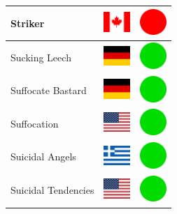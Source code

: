 \documentclass[12pt, a4paper, twoside]{report}
\begin{document}
\begin{center}
\begin{longtable}{|p{5cm}|p{2cm}|p{2cm}|}
 Striker                                                    & \includegraphics[width=1cm]{../4x3/ca} &   \includegraphics[width=1cm]{../likes/n} \\ \hline
 Sucking Leech                                              & \includegraphics[width=1cm]{../4x3/de} &   \includegraphics[width=1cm]{../likes/y} \\ \hline
 Suffocate Bastard                                          & \includegraphics[width=1cm]{../4x3/de} &   \includegraphics[width=1cm]{../likes/y} \\ \hline
 Suffocation                                                & \includegraphics[width=1cm]{../4x3/us} &   \includegraphics[width=1cm]{../likes/y} \\ \hline
 Suicidal Angels                                            & \includegraphics[width=1cm]{../4x3/gr} &   \includegraphics[width=1cm]{../likes/y} \\ \hline
 Suicidal Tendencies                                        & \includegraphics[width=1cm]{../4x3/us} &   \includegraphics[width=1cm]{../likes/y} \\ \hline

\end{longtable}
\end{center}
\end{document}
